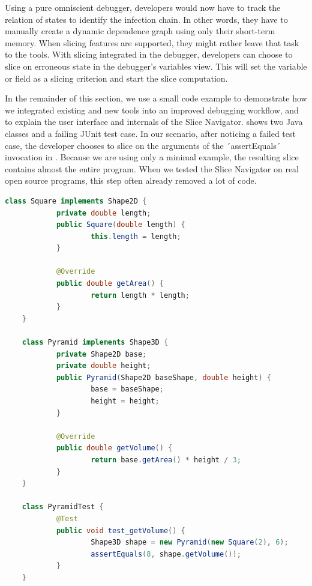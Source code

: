 Using a pure omniscient debugger, developers would now have to track the relation of states to identify the infection chain. 
In other words, they have to manually create a dynamic dependence graph using only their short-term memory. 
When slicing features are supported, they might rather leave that task to the tools.
\tmpEnd
With slicing integrated in the debugger, developers can choose to slice on erroneous state in the debugger's variables view.
This will set the variable or field as a slicing criterion and start the slice computation.
\tmpStart

In the remainder of this section, we use a small code example to demonstrate how we integrated existing and new tools into an improved debugging workflow,
and to explain the user interface and internals of the Slice Navigator. 
 shows two Java classes and a failing JUnit test case.
In our scenario, after noticing a failed test case, the developer chooses to slice on the arguments of the ´assertEquals´ invocation in .
Because we are using only a minimal example, the resulting slice contains almost the entire program.
When we tested the Slice Navigator on real open source programs, this step often already removed a lot of code.
%

\begin{lstlisting}[float=t,label=lst:example,caption={Example program with a failing test case},language=Java]
	class Square implements Shape2D {
			private double length;
			public Square(double length) { 
					this.length = length;
			}
			
			@Override
			public double getArea() { 
					return length * length;
			}
	}
		
	class Pyramid implements Shape3D {
			private Shape2D base;
			private double height;
			public Pyramid(Shape2D baseShape, double height) {
					base = baseShape;
					height = height;
			}
			
			@Override
			public double getVolume() { 
					return base.getArea() * height / 3; 
			}
	}
	
	class PyramidTest {
			@Test
			public void test_getVolume() {
					Shape3D shape = new Pyramid(new Square(2), 6);
					assertEquals(8, shape.getVolume());
			}
	}
\end{lstlisting}

